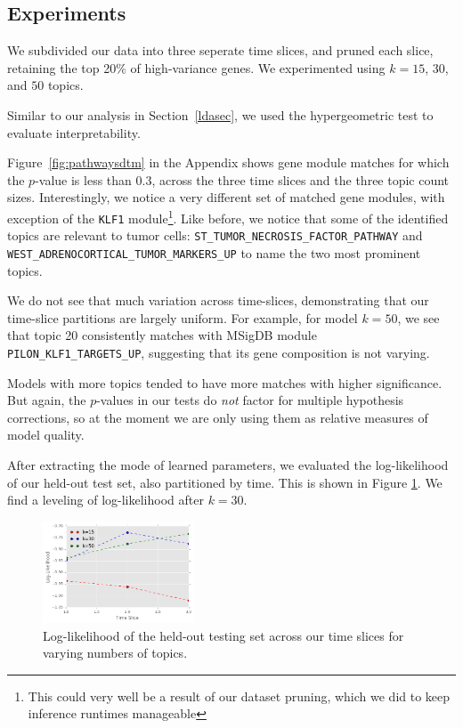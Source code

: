 \documentclass{article}
\begin{document}
\subsection{Experiments} 
We subdivided our data into three seperate time slices, and pruned each slice, retaining the top 20\% of high-variance genes. We experimented using $k=15$, $30$, and $50$ topics.

Similar to our analysis in Section~\ref{ldasec}, we used the hypergeometric test to evaluate interpretability. 

Figure~\ref{fig:pathwaysdtm} in the Appendix shows gene module matches for which the $p$-value is less than 0.3, across the three time slices and the three topic count sizes. Interestingly, we notice a very different set of matched gene modules, with exception of the \texttt{KLF1} module\footnote{This could very well be a result of our dataset pruning, which we did to keep inference runtimes manageable}. Like before, we notice that some of the identified topics are relevant to tumor cells:
\texttt{ST\_TUMOR\_NECROSIS\_FACTOR\_PATHWAY} and \texttt{WEST\_ADRENOCORTICAL\_TUMOR\_MARKERS\_UP} to name the two most prominent topics.

We do not see that much variation across time-slices, demonstrating that our time-slice partitions are largely uniform. For example, for model $k=50$, we see that topic 20 consistently matches with MSigDB module \texttt{PILON\_KLF1\_TARGETS\_UP}, suggesting that its gene composition is not varying.

Models with more topics tended to have more matches with higher significance. But again, the $p$-values in our tests do \textit{not} factor for multiple hypothesis corrections, so at the moment we are only using them as relative measures of model quality.

After extracting the mode of learned parameters, we evaluated the log-likelihood of our held-out test set, also partitioned by time. This is shown in Figure \ref{fig:lldtm}. We find a leveling of log-likelihood after $k=30$.

\begin{figure}
    \centering
    \includegraphics[width=0.4\textwidth]{figs/lldtm}
    \caption{Log-likelihood of the held-out testing set across our time slices for varying numbers of topics.}
    \label{fig:lldtm}
\vskip -0.2in
\end{figure}
\end{document}
